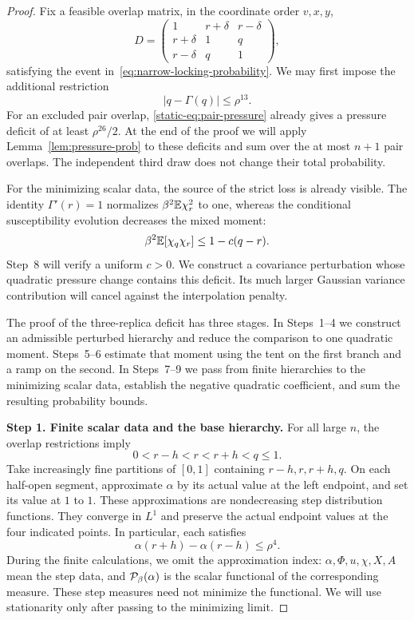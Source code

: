 \begin{proof}
Fix a feasible overlap matrix, in the coordinate order $v,x,y$,
\begin{equation}\label{eq:narrow-overlap-matrix}
 D=
 \begin{pmatrix}
 1&r+\delta&r-\delta\\
 r+\delta&1&q\\
 r-\delta&q&1
 \end{pmatrix},
\end{equation}
satisfying the event in~\eqref{eq:narrow-locking-probability}. We may
first impose the additional restriction
\begin{equation}\label{eq:narrow-pair-deviation}
 |q-\Gamma(q)|\le\rho^{13}.
\end{equation}
For an excluded pair overlap, \eqref{static-eq:pair-pressure} already gives a
pressure deficit of at least $\rho^{26}/2$. At the end of the proof
we will apply Lemma~\ref{lem:pressure-prob} to these deficits and sum
over the at most $n+1$ pair overlaps. The independent third draw does
not change their total probability.

For the minimizing scalar data, the source of the strict loss is already
visible. The identity
$\Gamma'(r)=1$ normalizes $\beta^2\mathbb E\chi_r^2$ to one, whereas the
conditional susceptibility evolution decreases the mixed moment:
\[
 \beta^2\mathbb E[\chi_q\chi_r]\le1-c(q-r).
\]
Step~8 will verify a uniform $c>0$. We construct a covariance
perturbation whose quadratic pressure change contains this deficit.
Its much larger Gaussian variance contribution will cancel against the
interpolation penalty.

The proof of the three-replica deficit has three stages. In
Steps~1--4 we construct an admissible perturbed hierarchy and reduce
the comparison to one quadratic moment. Steps~5--6 estimate that
moment using the tent on the first branch and a ramp on the second.
In Steps~7--9 we pass from finite hierarchies to the minimizing scalar
data, establish the negative quadratic coefficient, and sum the
resulting probability bounds.

\par\medskip\noindent\textbf{Step 1. Finite scalar data and the base hierarchy.}\enspace
For all large $n$, the overlap restrictions imply
\[
 0<r-h<r<r+h<q\le1.
\]
Take increasingly fine partitions of $[0,1]$ containing
$r-h,r,r+h,q$. On each half-open segment, approximate $\alpha$ by
its actual value at the left endpoint, and set its value at $1$ to
$1$. These approximations are nondecreasing step distribution
functions. They converge in $L^1$ and preserve the actual endpoint
values at the four indicated points. In particular, each satisfies
\begin{equation}\label{eq:narrow-step-oscillation}
 \alpha(r+h)-\alpha(r-h)\le\rho^4.
\end{equation}
During the finite calculations, we omit the approximation index:
$\alpha,\Phi,u,\chi,X,A$ mean the step data, and $\mathcal P_\beta(\alpha)$ is
the scalar functional of the corresponding measure. These step
measures need not minimize the functional. We will use stationarity
only after passing to the minimizing limit.


\end{proof}
